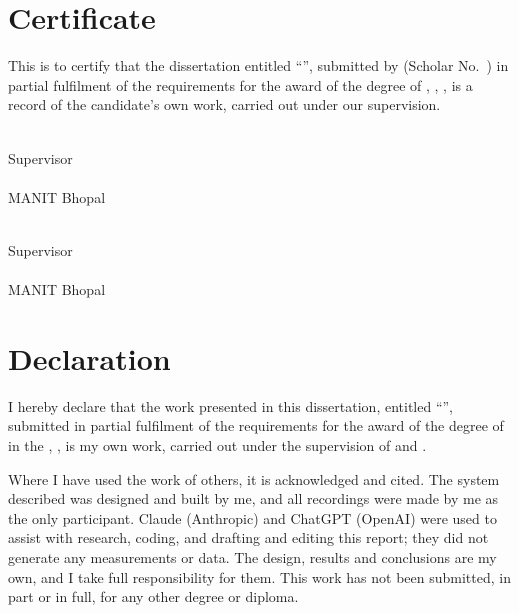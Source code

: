 \chapter*{Certificate}

This is to certify that the dissertation entitled ``\reportTitle'', submitted by \authorName{} (Scholar No.\ \scholarNo) in partial fulfilment of the requirements for the award of the degree of \degree{}, \department, \institute, is a record of the candidate's own work, carried out under our supervision.

\vspace{3cm}
\noindent
\begin{minipage}[t]{0.45\linewidth}
\supervisorA\\
Supervisor\\
\department\\
MANIT Bhopal
\end{minipage}\hfill
\begin{minipage}[t]{0.45\linewidth}
\supervisorB\\
Supervisor\\
\department\\
MANIT Bhopal
\end{minipage}

\chapter*{Declaration}

I hereby declare that the work presented in this dissertation, entitled ``\reportTitle'', submitted in partial fulfilment of the requirements for the award of the degree of \degree{} in the \department, \institute, is my own work, carried out under the supervision of \supervisorA{} and \supervisorB.

Where I have used the work of others, it is acknowledged and cited. The system described was designed and built by me, and all recordings were made by me as the only participant. Claude (Anthropic) and ChatGPT (OpenAI) were used to assist with research, coding, and drafting and editing this report; they did not generate any measurements or data. The design, results and conclusions are my own, and I take full responsibility for them. This work has not been submitted, in part or in full, for any other degree or diploma.

